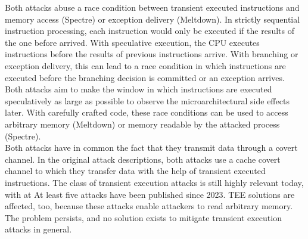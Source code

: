Both attacks abuse a race condition between transient executed instructions and
memory access (Spectre) or exception delivery (Meltdown). In strictly sequential
instruction processing, each instruction would only be executed if the results
of the one before arrived. With speculative execution, the CPU executes
instructions before the results of previous instructions arrive. With branching
or exception delivery, this can lead to a race condition in which instructions
are executed before the branching decision is committed or an exception arrives.
Both attacks aim to make the window in which instructions are executed
speculatively as large as possible to observe the microarchitectural side
effects later. With carefully crafted code, these race conditions can be used to
access arbitrary memory (Meltdown) or memory readable by the attacked process
(Spectre). \\

Both attacks have in common the fact that they transmit data through a covert
channel. In the original attack descriptions, both attacks use a cache covert
channel to which they transfer data with the help of transient executed
instructions. The class of transient execution attacks is still highly relevant
today, with at At least five attacks have been published since 2023.
\cite{ormandy2023zenbleed,trujillo2023inception, moghimi2023downfall,ragab_ghostrace_2024, wilke2024tdxdown}
TEE solutions are affected, too, because these attacks enable attackers to read
arbitrary memory. The problem persists, and no solution exists to mitigate
transient execution attacks in general.\\

